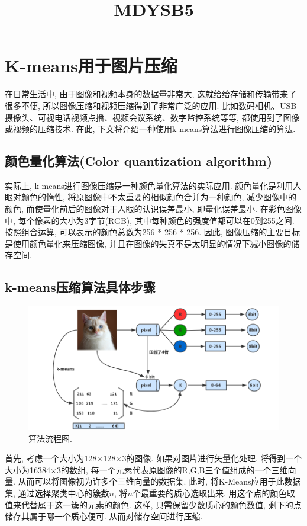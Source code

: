 \documentclass[lang=cn,11pt]{elegantpaper}
\title{MDYSB5}
\date{}
\begin{document}
% 
\newpage
\maketitle

	
\thispagestyle{empty}
\newpage
\normalsize
{}

\section{K-means用于图片压缩}
在日常生活中, 由于图像和视频本身的数据量非常大, 这就给给存储和传输带来了很多不便, 所以图像压缩和视频压缩得到了非常广泛的应用. 比如数码相机、USB 摄像头、可视电话视频点播、视频会议系统、数字监控系统等等, 都使用到了图像或视频的压缩技术. 在此, 下文将介绍一种使用k-means算法进行图像压缩的算法. 
\subsection{颜色量化算法(Color quantization algorithm)}
实际上, k-means进行图像压缩是一种颜色量化算法的实际应用. 颜色量化是利用人眼对颜色的惰性, 将原图像中不太重要的相似颜色合并为一种颜色, 减少图像中的颜色, 而使量化前后的图像对于人眼的认识误差最小, 即量化误差最小. 在彩色图像中, 每个像素的大小为3字节(RGB), 其中每种颜色的强度值都可以在0到255之间. 按照组合运算, 可以表示的颜色总数为256 * 256 * 256. 因此, 图像压缩的主要目标是使用颜色量化来压缩图像, 并且在图像的失真不是太明显的情况下减小图像的储存空间. 
\subsection{k-means压缩算法具体步骤}
\begin{figure}[ht]
    \centering
    \includegraphics[width=.8\textwidth]{Flow}
    \caption{算法流程图. \label{fig:flow}}
\end{figure}
首先, 考虑一个大小为128$\times$128$\times$3的图像. 如果对图片进行矢量化处理, 将得到一个大小为16384$\times$3的数组, 每一个元素代表原图像的R,G,B三个值组成的一个三维向量. 从而可以将图像视为许多个三维向量的数据集. 此时, 将K-Means应用于此数据集, 通过选择聚类中心的簇数$n$, 将$n$个最重要的质心选取出来. 用这个点的颜色取值来代替属于这一簇的元素的颜色. 这样, 只需保留少数质心的颜色数值, 剩下的点储存其属于哪一个质心便可. 从而对储存空间进行压缩. 
\end{document}
